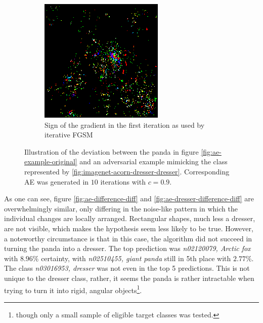 \documentclass[11pt, a4paper]{article}
\begin{document}
\begin{figure}[h!tb]
\begin{subfigure}[t]{0.45\textwidth}
        \includegraphics[width=\textwidth]{aes/panda_dresser_10_0dot9_grad.png}
        \caption{Sign of the gradient in the first iteration as used by iterative FGSM}
        \label{fig:ae-dresser-difference-grad}
    \end{subfigure}
    \caption[Difference between original and a failed adversarial example]{Illustration of the deviation between the panda in figure \ref{fig:ae-example-original} and an adversarial example mimicking the class represented by \ref{fig:imagenet-acorn-dresser-dresser}. Corresponding AE was generated in $10$ iterations with $c = 0.9$.}
    \label{fig:ae-dresser-difference}
\end{figure}

As one can see, figure \ref{fig:ae-difference-diff} and \ref{fig:ae-dresser-difference-diff} are overwhelmingly similar, only differing in the noise-like pattern in which the individual changes are locally arranged. Rectangular shapes, much less a dresser, are not visible, which makes the hypothesis seem less likely to be true. However, a noteworthy circumstance is that in this case, the algorithm did not succeed in turning the panda into a dresser. The top prediction was \emph{n02120079, Arctic fox} with $8.96\%$ certainty, with \emph{n02510455, giant panda} still in 5th place with $2.77\%$. The class \emph{n03016953, dresser} was not even in the top 5 predictions. This is not unique to the dresser class, rather, it seems the panda is rather intractable when trying to turn it into rigid, angular objects\footnote{though only a small sample of eligible target classes was tested.}.
\end{document}
